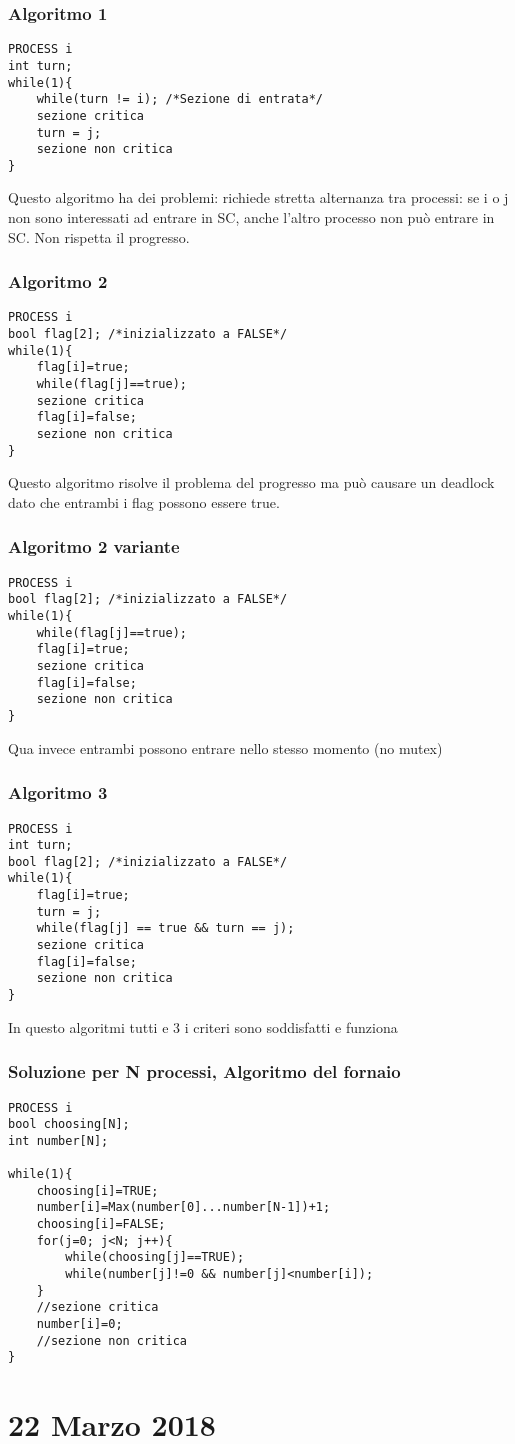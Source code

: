 \documentclass{article}
\begin{document}
\subsubsection*{Algoritmo 1}
\begin{Verbatim}
PROCESS i
int turn;
while(1){
	while(turn != i); /*Sezione di entrata*/
	sezione critica
	turn = j;
	sezione non critica
}
\end{Verbatim}
Questo algoritmo ha dei problemi: richiede stretta alternanza tra processi: se
i o j non sono interessati ad entrare in SC, anche l'altro processo non pu\`{o}
entrare in SC. Non rispetta il progresso.
\subsubsection*{Algoritmo 2}
\begin{Verbatim}
PROCESS i
bool flag[2]; /*inizializzato a FALSE*/
while(1){
	flag[i]=true;
	while(flag[j]==true);
	sezione critica
	flag[i]=false;
	sezione non critica
}
\end{Verbatim}
Questo algoritmo risolve il problema del progresso ma pu\`{o} causare un deadlock
dato che entrambi i flag possono essere true.
\subsubsection*{Algoritmo 2 variante}
\begin{Verbatim}
PROCESS i
bool flag[2]; /*inizializzato a FALSE*/
while(1){
	while(flag[j]==true);
	flag[i]=true;
	sezione critica
	flag[i]=false;
	sezione non critica
}
\end{Verbatim}
Qua invece entrambi possono entrare nello stesso momento (no mutex)
\subsubsection*{Algoritmo 3}
\begin{Verbatim}
PROCESS i
int turn;
bool flag[2]; /*inizializzato a FALSE*/
while(1){
	flag[i]=true;
	turn = j;
	while(flag[j] == true && turn == j);
	sezione critica
	flag[i]=false;
	sezione non critica
}
\end{Verbatim}
In questo algoritmi tutti e 3 i criteri sono soddisfatti e funziona
\subsubsection*{Soluzione per N processi, Algoritmo del fornaio}
\begin{Verbatim}
PROCESS i
bool choosing[N];
int number[N];

while(1){
	choosing[i]=TRUE;
	number[i]=Max(number[0]...number[N-1])+1;
	choosing[i]=FALSE;
	for(j=0; j<N; j++){
		while(choosing[j]==TRUE);
		while(number[j]!=0 && number[j]<number[i]);
	}
	//sezione critica
	number[i]=0;
	//sezione non critica
}
\end{Verbatim}

\section*{22 Marzo 2018}
\end{document}
